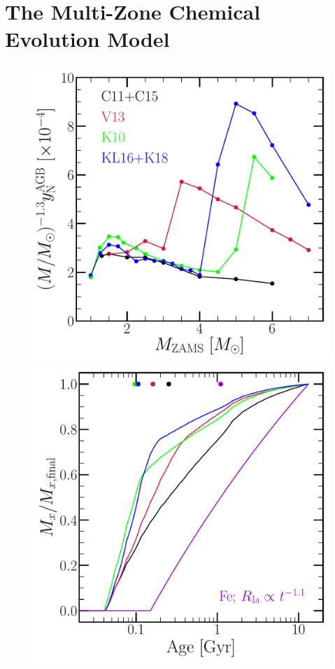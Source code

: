 \documentclass[ms.tex]{subfiles}
\begin{document}
 

\section{The Multi-Zone Chemical Evolution Model} 
\label{sec:methods} 

\begin{figure} 
\centering 
\includegraphics[scale = 0.3]{agb_yield_models_imfweighted.pdf} 
\includegraphics[scale = 0.3]{ssp_production_modelcomp.pdf} 

\end{figure}
\end{document}
